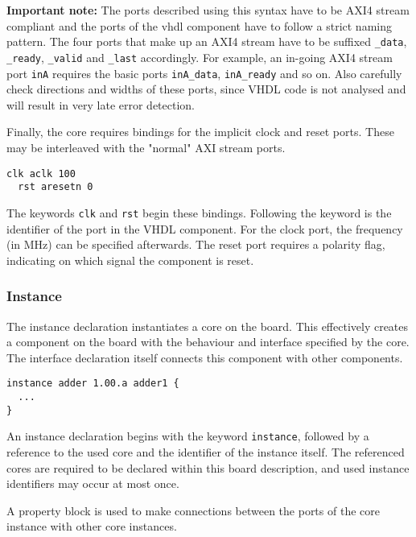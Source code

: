 \documentclass{report}
\begin{document}
\textbf{Important note:} The ports described using this syntax have to be AXI4 stream compliant and the ports of the vhdl component have to follow a strict naming pattern. The four ports that make up an AXI4 stream have to be suffixed \texttt{\_data}, \texttt{\_ready}, \texttt{\_valid} and \texttt{\_last} accordingly. For example, an in-going AXI4 stream port \texttt{inA} requires the basic ports \texttt{inA\_data}, \texttt{inA\_ready} and so on. Also carefully check directions and widths of these ports, since VHDL code is not analysed and will result in very late error detection.


Finally, the core requires bindings for the implicit clock and reset ports. These may be interleaved with the "normal" AXI stream ports.

\begin{lstlisting}[language=bdl]
  clk aclk 100
  rst aresetn 0
\end{lstlisting}

The keywords \texttt{clk} and \texttt{rst} begin these bindings. Following the keyword is the identifier of the port in the VHDL component. For the clock port, the frequency (in MHz) can be specified afterwards. The reset port requires a polarity flag, indicating on which signal the component is reset.

\subsubsection{Instance}
The instance declaration instantiates a core on the board. This effectively creates a component on the board with the behaviour and interface specified by the core. The interface declaration itself connects this component with other components.

\begin{lstlisting}[language=bdl]
instance adder 1.00.a adder1 {
  ...
}
\end{lstlisting}

An instance declaration begins with the keyword \texttt{instance}, followed by a reference to the used core and the identifier of the instance itself. The referenced cores are required to be declared within this board description, and used instance identifiers may occur at most once.

A property block is used to make connections between the ports of the core instance with other core instances.
\end{document}

